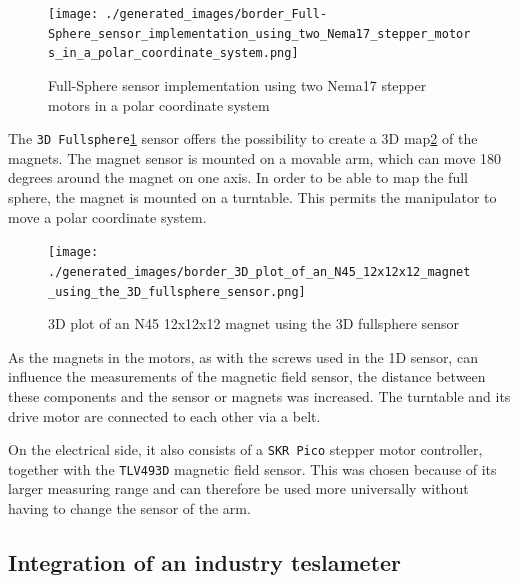 \begin{figure}
\centering
\texttt{[image: ./generated\_images/border\_Full-Sphere\_sensor\_implementation\_using\_two\_Nema17\_stepper\_motors\_in\_a\_polar\_coordinate\_system.png]}
\caption{Full-Sphere sensor implementation using two Nema17 stepper
motors in a polar coordinate system
\label{Full-Sphere_sensor_implementation_using_two_Nema17_stepper_motors_in_a_polar_coordinate_system.png}}
\end{figure}

The
\passthrough{\lstinline!3D Fullsphere!}\ref{Full-Sphere_sensor_implementation_using_two_Nema17_stepper_motors_in_a_polar_coordinate_system.png}
sensor offers the possibility to create a 3D
map\ref{3D_plot_of_an_N45_12x12x12_magnet_using_the_3D_fullsphere_sensor.png}
of the magnets. The magnet sensor is mounted on a movable arm, which can
move 180 degrees around the magnet on one axis. In order to be able to
map the full sphere, the magnet is mounted on a turntable. This permits
the manipulator to move a polar coordinate system.

\begin{figure}
\centering
\texttt{[image: ./generated\_images/border\_3D\_plot\_of\_an\_N45\_12x12x12\_magnet\_using\_the\_3D\_fullsphere\_sensor.png]}
\caption{3D plot of an N45 12x12x12 magnet using the 3D fullsphere
sensor
\label{3D_plot_of_an_N45_12x12x12_magnet_using_the_3D_fullsphere_sensor.png}}
\end{figure}

As the magnets in the motors, as with the screws used in the 1D sensor,
can influence the measurements of the magnetic field sensor, the
distance between these components and the sensor or magnets was
increased. The turntable and its drive motor are connected to each other
via a belt.

On the electrical side, it also consists of a
\passthrough{\lstinline!SKR Pico!} stepper motor controller, together
with the \passthrough{\lstinline!TLV493D!} magnetic field sensor. This
was chosen because of its larger measuring range and can therefore be
used more universally without having to change the sensor of the arm.

\hypertarget{integration-of-an-industry-teslameter}{%
\subsection{Integration of an industry
teslameter}\label{integration-of-an-industry-teslameter}}

